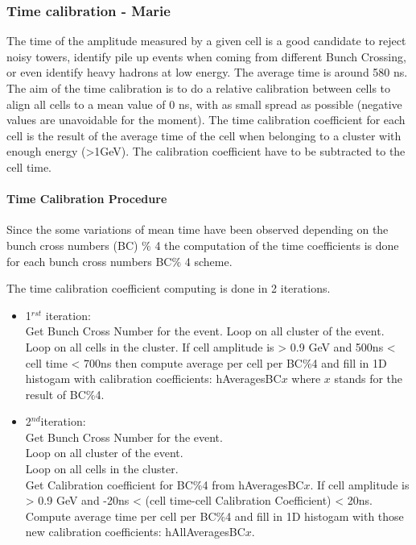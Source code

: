 \subsubsection{Time calibration - Marie }

The time of the amplitude measured by a given cell is a good candidate to reject noisy towers, identify pile up events when coming from different Bunch Crossing, or even identify heavy hadrons at low energy. The average time is around 580 ns. The aim of the time calibration is to do a relative calibration between cells to align all cells to a mean value of 0 ns, with as small spread as possible (negative values are unavoidable for the moment). The time calibration coefficient for each cell is the result of the average time of the cell when belonging to a cluster with enough energy (>1GeV). 
The calibration coefficient have to be subtracted to the cell time.

\paragraph*{Time Calibration Procedure\\}

Since the some variations of mean time have been observed depending on the bunch cross numbers (BC) $\%$ 4 the computation of the time coefficients is done for each bunch cross numbers BC$\%$ 4 scheme.

The time calibration coefficient computing is done in 2 iterations. 
\begin{itemize}
\item 1$^{rst}$  iteration:\\
Get Bunch Cross Number for the event.
Loop on all cluster of the event. \\ Loop on all cells in the cluster.
If cell amplitude is > 0.9 GeV and 500ns < cell time < 700ns then 
compute average per cell per BC$\%$4 and fill in 1D histogam with calibration coefficients: hAveragesBC$x$ where $x$ stands for the result of BC$\%$4.
\item 2$^{nd}$iteration:\\
Get Bunch Cross Number for the event.\\ 
Loop on all cluster of the event. \\ Loop on all cells in the cluster.\\ 
Get Calibration coefficient for BC$\%$4 from  hAveragesBC$x$.  If cell amplitude is > 0.9 GeV and -20ns < (cell time-cell Calibration Coefficient)  < 20ns.\\
Compute average time per cell per BC$\%$4 and fill in 1D histogam with those new calibration coefficients: hAllAveragesBC$x$.
\end{itemize}


